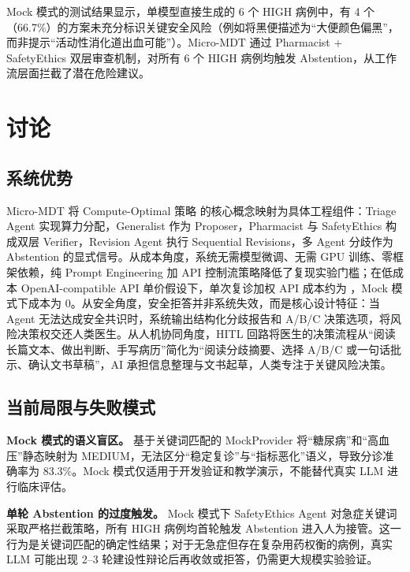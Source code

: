 \documentclass[11pt,a4paper]{ctexart}
\begin{document}
Mock 模式的测试结果显示，单模型直接生成的 6 个 HIGH 病例中，有 4 个（66.7\%）的方案未充分标识关键安全风险（例如将黑便描述为``大便颜色偏黑''，而非提示``活动性消化道出血可能''）。Micro-MDT 通过 Pharmacist + SafetyEthics 双层审查机制，对所有 6 个 HIGH 病例均触发 Abstention，从工作流层面拦截了潜在危险建议。

\newpage
\section{讨论}

\subsection{系统优势}

Micro-MDT 将 Compute-Optimal 策略 \cite{snell2024scaling} 的核心概念映射为具体工程组件：Triage Agent 实现算力分配，Generalist 作为 Proposer，Pharmacist 与 SafetyEthics 构成双层 Verifier，Revision Agent 执行 Sequential Revisions，多 Agent 分歧作为 Abstention 的显式信号。从成本角度，系统无需模型微调、无需 GPU 训练、零框架依赖，纯 Prompt Engineering 加 API 控制流策略降低了复现实验门槛；在低成本 OpenAI-compatible API 单价假设下，单次复诊加权 API 成本约为 ，Mock 模式下成本为 0。从安全角度，安全拒答并非系统失效，而是核心设计特征：当 Agent 无法达成安全共识时，系统输出结构化分歧报告和 A/B/C 决策选项，将风险决策权交还人类医生。从人机协同角度，HITL 回路将医生的决策流程从``阅读长篇文本、做出判断、手写病历''简化为``阅读分歧摘要、选择 A/B/C 或一句话批示、确认文书草稿''，AI 承担信息整理与文书起草，人类专注于关键风险决策。

\subsection{当前局限与失败模式}

\textbf{Mock 模式的语义盲区。} 基于关键词匹配的 MockProvider 将``糖尿病''和``高血压''静态映射为 MEDIUM，无法区分``稳定复诊''与``指标恶化''语义，导致分诊准确率为 83.3\%。Mock 模式仅适用于开发验证和教学演示，不能替代真实 LLM 进行临床评估。

\textbf{单轮 Abstention 的过度触发。} Mock 模式下 SafetyEthics Agent 对急症关键词采取严格拦截策略，所有 HIGH 病例均首轮触发 Abstention 进入人为接管。这一行为是关键词匹配的确定性结果；对于无急症但存在复杂用药权衡的病例，真实 LLM 可能出现 2--3 轮建设性辩论后再收敛或拒答，仍需更大规模实验验证。
\end{document}
